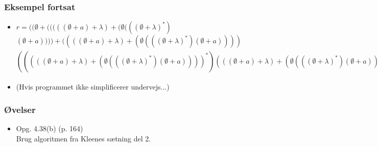 \begin{frame}
\frametitle{Eksempel fortsat}
\begin{itemize}[<+->]
\item \tiny{$r = ((\emptyset+(((((\emptyset +a)+\lambda)+(\emptyset (((\emptyset +\lambda )^*)$$(\emptyset +a))))+((((\emptyset +a)+\lambda )+(\emptyset (((\emptyset +\lambda )^*)(\emptyset +a) )))$$(((((\emptyset +a)+\lambda )+(\emptyset (((\emptyset +\lambda )^*)(\emptyset +a))))^*)(((\emptyset +a)+\lambda )+(\emptyset (((\emptyset +\lambda )^*)(\emptyset +a)))))))+((((\emptyset +b)+(\emptyset (((\emptyset +\lambda )^*)(\emptyset +b))))+((((\emptyset +a)+\lambda )+(\emptyset (((\emptyset +\lambda )^*)(\emptyset +a))))(((((\emptyset +a)+\lambda )+(\emptyset (((\emptyset +\lambda )^*)(\emptyset +a))))^*)((\emptyset +b)+(\emptyset (((\emptyset +\lambda )^*)(\emptyset +b)))))))(((((\emptyset +\lambda )+((\emptyset +b)(((\emptyset +\lambda )^*)(\emptyset +b))))+(((\emptyset +a)+((\emptyset +b)(((\emptyset +\lambda )^*)(\emptyset +a))))(((((\emptyset +a)+\lambda )+(\emptyset (((\emptyset +\lambda )^*)(\emptyset +a))))^*)((\emptyset +b)+(\emptyset (((\emptyset +\lambda )^*)(\emptyset +b)))))))^*)(((\emptyset +a)+((\emptyset +b)(((\emptyset +\lambda )^*)(\emptyset +a))))+(((\emptyset +a)+((\emptyset +b)(((\emptyset +\lambda )^*)(\emptyset +a))))(((((\emptyset +a)+\lambda )+(\emptyset (((\emptyset +\lambda )^*)(\emptyset +a))))^*)(((\emptyset +a)+\lambda )+(\emptyset (((\emptyset +\lambda )^*)(\emptyset +a)))))))))))+((((\emptyset +b)+(\emptyset (((\emptyset +\lambda )^*)(\emptyset +b))))+((((\emptyset +a)+\lambda )+(\emptyset (((\emptyset +\lambda )^*)(\emptyset +a))))(((((\emptyset +a)+\lambda )+(\emptyset (((\emptyset +\lambda )^*)(\emptyset +a))))^*)((\emptyset +b)+(\emptyset (((\emptyset +\lambda )^*)(\emptyset +b)))))))+((((\emptyset +b)+(\emptyset (((\emptyset +\lambda )^*)(\emptyset +b))))+((((\emptyset +a)+\lambda )+(\emptyset (((\emptyset +\lambda )^*)(\emptyset +a))))(((((\emptyset +a)+\lambda )+(\emptyset (((\emptyset +\lambda )^*)(\emptyset +a))))^*)((\emptyset +b)+(\emptyset (((\emptyset +\lambda )^*)(\emptyset +b)))))))(((((\emptyset +\lambda )+((\emptyset +b)(((\emptyset +\lambda )^*)(\emptyset +b))))+(((\emptyset +a)+((\emptyset +b)(((\emptyset +\lambda )^*)(\emptyset +a))))(((((\emptyset +a)+\lambda )+(\emptyset (((\emptyset +\lambda )^*)(\emptyset +a))))^*)((\emptyset +b)+(\emptyset (((\emptyset +\lambda )^*)(\emptyset +b)))))))^*)(((\emptyset +\lambda )+((\emptyset +b)(((\emptyset +\lambda )^*)(\emptyset +b))))+(((\emptyset +a)+((\emptyset +b)(((\emptyset +\lambda )^*)(\emptyset +a))))(((((\emptyset +a)+\lambda )+(\emptyset (((\emptyset +\lambda )^*)(\emptyset +a))))^*)((\emptyset +b)+(\emptyset (((\emptyset +\lambda )^*)(\emptyset +b))))))))))) $}
\item (Hvis programmet ikke simplificerer undervejs...)
\end{itemize}
\end{frame}
\begin{frame}
\frametitle{Øvelser}
\begin{itemize}
\item [Martin] Opg. 4.38(b) (p. 164)\\
Brug algoritmen fra Kleenes sætning del 2.
\end{itemize}
\end{frame}
